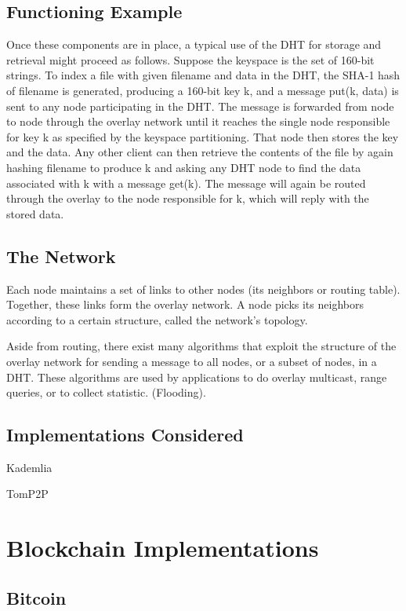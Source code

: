 \subsection{Functioning Example}
Once these components are in place, a typical use of the DHT for storage and retrieval might proceed as follows. Suppose the keyspace is the set of 160-bit strings. To index a file with given filename and data in the DHT, the SHA-1 hash of filename is generated, producing a 160-bit key k, and a message put(k, data) is sent to any node participating in the DHT. The message is forwarded from node to node through the overlay network until it reaches the single node responsible for key k as specified by the keyspace partitioning. That node then stores the key and the data. Any other client can then retrieve the contents of the file by again hashing filename to produce k and asking any DHT node to find the data associated with k with a message get(k). The message will again be routed through the overlay to the node responsible for k, which will reply with the stored data.

\subsection{The Network}
Each node maintains a set of links to other nodes (its neighbors or routing table). Together, these links form the overlay network. A node picks its neighbors according to a certain structure, called the network's topology.

Aside from routing, there exist many algorithms that exploit the structure of the overlay network for sending a message to all nodes, or a subset of nodes, in a DHT. These algorithms are used by applications to do overlay multicast, range queries, or to collect statistic. (Flooding). 

\subsection*{Implementations Considered}
\begin{list}{}{}
\item Kademlia 
\item TomP2P
\end{list}

\section{Blockchain Implementations}
\subsection*{Bitcoin}
